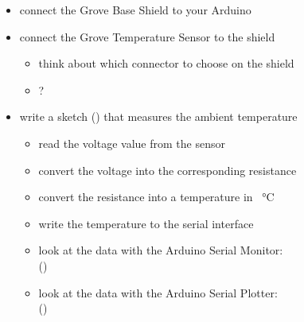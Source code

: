 \begin{itemize}
	\item connect the Grove Base Shield to your Arduino
	\item connect the Grove Temperature Sensor to the shield
	\begin{itemize}
		\item think about which connector to choose on the shield
		\item {}?
	\end{itemize}
	\item write a sketch () that measures the ambient temperature
	\begin{itemize}
		\item read the voltage value from the sensor
		\item convert the voltage into the corresponding resistance
		\item convert the resistance into a temperature in \SI{}{\degreeCelsius}
		\item write the temperature to the serial interface
		\item look at the data with the Arduino Serial Monitor:\\  ()
		\item look at the data with the Arduino Serial Plotter:\\  ()
	\end{itemize}
\end{itemize}

